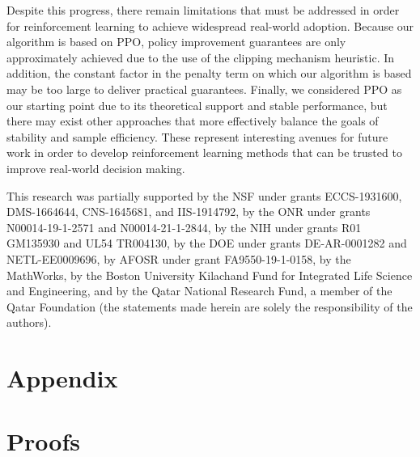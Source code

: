 \documentclass{article}
\begin{document}
Despite this progress, there remain limitations that must be addressed in order for reinforcement learning to achieve widespread real-world adoption. Because our algorithm is based on PPO, policy improvement guarantees are only approximately achieved due to the use of the clipping mechanism heuristic. In addition, the constant factor in the penalty term on which our algorithm is based may be too large to deliver practical guarantees. Finally, we considered PPO as our starting point due to its theoretical support and stable performance, but there may exist other approaches that more effectively balance the goals of stability and sample efficiency. These represent interesting avenues for future work in order to develop reinforcement learning methods that can be trusted to improve real-world decision making.



\begin{ack}
This research was partially supported by the NSF under grants ECCS-1931600, DMS-1664644, CNS-1645681, and IIS-1914792, by the ONR under grants N00014-19-1-2571 and N00014-21-1-2844, by the NIH under grants R01 GM135930 and UL54 TR004130, by the DOE under grants DE-AR-0001282 and NETL-EE0009696, by AFOSR under grant FA9550-19-1-0158, by the MathWorks, by the Boston University Kilachand Fund for Integrated Life Science and Engineering, and by the Qatar National Research Fund, a member of the Qatar Foundation (the statements made herein are solely the responsibility of the authors).
\end{ack}






\newpage

\section*{Appendix}

\appendix


\section{Proofs}\label{sec:app_proofs}
\end{document}
